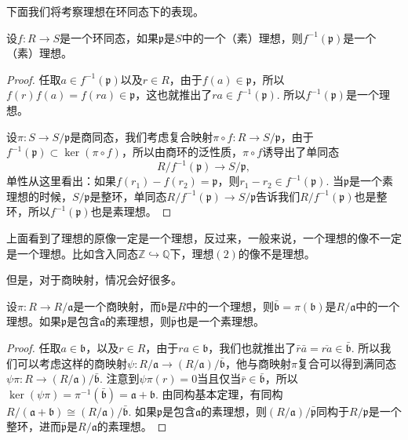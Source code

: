 
下面我们将考察理想在环同态下的表现。

\begin{pro}
设$f:R\to S$是一个环同态，如果$\mathfrak{p}$是$S$中的一个（素）理想，则$f^{-1}(\mathfrak{p})$是一个（素）理想。
\end{pro}

\begin{proof}
	任取$a\in f^{-1}(\mathfrak{p})$以及$r\in R$，由于$f(a)\in \mathfrak{p}$，所以$f(r)f(a)=f(ra)\in \mathfrak{p}$，这也就推出了$ra\in f^{-1}(\mathfrak{p})$. 所以$f^{-1}(\mathfrak{p})$是一个理想。

	设$\pi:S\to S/\mathfrak{p}$是商同态，我们考虑复合映射$\pi\circ f:R\to S/\mathfrak{p}$，由于$f^{-1}(\mathfrak{p})\subset \ker(\pi\circ f)$，所以由商环的泛性质，$\pi\circ f$诱导出了单同态\[R/f^{-1}(\mathfrak{p})\to S/\mathfrak{p},\]
	单性从这里看出：如果$f(r_1)-f(r_2)=\mathfrak{p}$，则$r_1-r_2\in f^{-1}(\mathfrak{p})$. 当$\mathfrak{p}$是一个素理想的时候，$S/\mathfrak{p}$是整环，单同态$R/f^{-1}(\mathfrak{p})\to S/\mathfrak{p}$告诉我们$R/f^{-1}(\mathfrak{p})$也是整环，所以$f^{-1}(\mathfrak{p})$也是素理想。
\end{proof}

上面看到了理想的原像一定是一个理想，反过来，一般来说，一个理想的像不一定是一个理想。比如含入同态$\mathbb{Z}\hookrightarrow \mathbb{Q}$下，理想$(2)$的像不是理想。

但是，对于商映射，情况会好很多。

\begin{pro}
设$\pi:R\to R/\mathfrak{a}$是一个商映射，而$\mathfrak{b}$是$R$中的一个理想，则$\bar{\mathfrak{b}}=\pi(\mathfrak{b})$是$R/\mathfrak{a}$中的一个理想。如果$\mathfrak{p}$是包含$\mathfrak{a}$的素理想，则$\bar{\mathfrak{p}}$也是一个素理想。
\end{pro}

\begin{proof}
任取$a\in \mathfrak{b}$，以及$r \in R$，由于$ra\in \mathfrak{b}$，我们也就推出了$\bar{r}\bar{a}=\overline{ra}\in \bar{\mathfrak{b}}$. 所以我们可以考虑这样的商映射$\psi: R/\mathfrak{a}\to (R/\mathfrak{a})/\bar{\mathfrak{b}}$，他与商映射$\pi$复合可以得到满同态$\psi\pi:R\to (R/\mathfrak{a})/\bar{\mathfrak{b}}$. 注意到$\psi\pi(r)=0$当且仅当$\bar{r}\in \bar{\mathfrak{b}}$，所以$\ker(\psi\pi)=\pi^{-1}(\bar{\mathfrak{b}})=\mathfrak{a}+\mathfrak{b}$. 由同构基本定理，有同构$R/(\mathfrak{a}+\mathfrak{b})\cong (R/\mathfrak{a})/\bar{\mathfrak{b}}$. 如果$\mathfrak p$是包含$\mathfrak a$的素理想，则$(R/\mathfrak{a})/\bar{\mathfrak{p}}$同构于$R/\mathfrak p$是一个整环，进而$\bar {\mathfrak p}$是$R/\mathfrak a$的素理想。
\end{proof}

